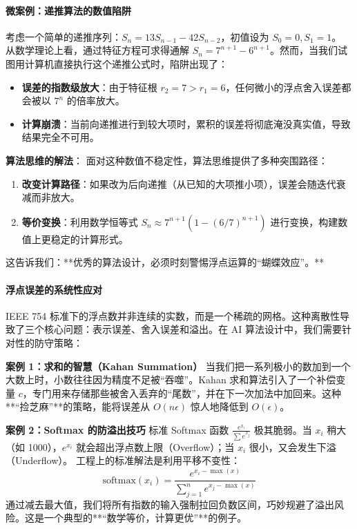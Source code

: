 \paragraph{微案例：递推算法的数值陷阱}

考虑一个简单的递推序列：$S_n = 13S_{n-1} - 42S_{n-2}$，初值设为 $S_0 = 0, S_1 = 1$。
从数学理论上看，通过特征方程可求得通解 $S_n = 7^{n+1} - 6^{n+1}$。然而，当我们试图用计算机直接执行这个递推公式时，陷阱出现了：

\begin{itemize}
    \item \textbf{误差的指数级放大}：由于特征根 $r_2 = 7 > r_1 = 6$，任何微小的浮点舍入误差都会被以 $7^n$ 的倍率放大。
    \item \textbf{计算崩溃}：当前向递推进行到较大项时，累积的误差将彻底淹没真实值，导致结果完全不可用。
\end{itemize}

\textbf{算法思维的解法}：
面对这种数值不稳定性，算法思维提供了多种突围路径：
\begin{enumerate}
    \item \textbf{改变计算路径}：如果改为后向递推（从已知的大项推小项），误差会随迭代衰减而非放大。
    \item \textbf{等价变换}：利用数学恒等式 $S_n \approx 7^{n+1} (1 - (6/7)^{n+1})$ 进行变换，构建数值上更稳定的计算形式。
\end{enumerate}

这告诉我们：**优秀的算法设计，必须时刻警惕浮点运算的“蝴蝶效应”。**

\paragraph{浮点误差的系统性应对}

IEEE 754 标准下的浮点数并非连续的实数，而是一个稀疏的网格。这种离散性导致了三个核心问题：表示误差、舍入误差和溢出。在 AI 算法设计中，我们需要针对性的防守策略：

\textbf{案例 1：求和的智慧（Kahan Summation）}
当我们把一系列极小的数加到一个大数上时，小数往往因为精度不足被“吞噬”。Kahan 求和算法引入了一个补偿变量 $c$，专门用来存储那些被舍入丢弃的“尾数”，并在下一次加法中加回来。这种**“捡芝麻”**的策略，能将误差从 $O(n\epsilon)$ 惊人地降低到 $O(\epsilon)$。

\textbf{案例 2：Softmax 的防溢出技巧}
标准 Softmax 函数 $\frac{e^{x_i}}{\sum e^{x_j}}$ 极其脆弱。当 $x_i$ 稍大（如 1000），$e^{x_i}$ 就会超出浮点数上限（Overflow）；当 $x_i$ 很小，又会发生下溢（Underflow）。
工程上的标准解法是利用平移不变性：
$$\text{softmax}(x_i) = \frac{e^{x_i - \max(x)}}{\sum_{j=1}^n e^{x_j - \max(x)}}$$
通过减去最大值，我们将所有指数的输入强制拉回负数区间，巧妙规避了溢出风险。这是一个典型的**“数学等价，计算更优”**的例子。

